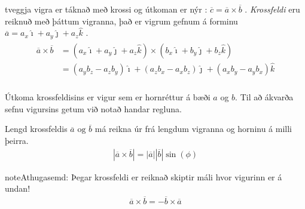 \documentclass[a4paper,10pt,icelandic]{sphinxmanual}
\begin{document}
 tveggja vigra er táknað með krossi og útkoman er nýr : \(\overline{c} = \overline{a} \times \overline{b}\) .
\textit{Krossfeldi} eru reiknuð með þáttum vigranna, það er vigrum gefnum á forminu \(\overline{a} = a_x \hat{\imath} + a_y \hat{\jmath} + a_z \hat{k}\) .
\begin{equation*}
\begin{split}\begin{aligned}
\overline{a} \times \overline{b} &= (a_x \hat{\imath} + a_y \hat{\jmath} + a_z \hat{k}) \times (b_x \hat{\imath} + b_y \hat{\jmath} + b_z \hat{k}) \\
&= (a_y b_z - a_z b_y)\hat{\imath} + (a_z b_x - a_x b_z)\hat{\jmath} + (a_x b_y - a_y b_x)\hat{k} \\
\end{aligned}\end{split}
\end{equation*}
\begin{figure}[htbp]
\centering

\noindent{}
\end{figure}

Útkoma krossfeldisins er vigur sem er hornréttur á bæði \(a\) og \(b\).
Til að ákvarða sefnu vigursins getum við notað  handar regluna.

\begin{figure}[htbp]
\centering

\noindent{}
\end{figure}

Lengd krossfeldis \(\overline{a} \text{ og } \overline{b}\) má reikna úr frá lengdum vigranna og horninu á milli þeirra.
\begin{equation*}
\begin{split}|\overline{a} \times \overline{b}| = |\overline{a}| |\overline{b}| \sin(\phi)\end{split}
\end{equation*}
\begin{sphinxadmonition}{note}{Athugasemd:}
Þegar krossfeldi er reiknað skiptir máli hvor vigurinn er á undan!
\begin{equation*}
\begin{split}\overline{a} \times \overline{b} = - \overline{b} \times \overline{a}\end{split}
\end{equation*}\end{sphinxadmonition}
\end{document}
